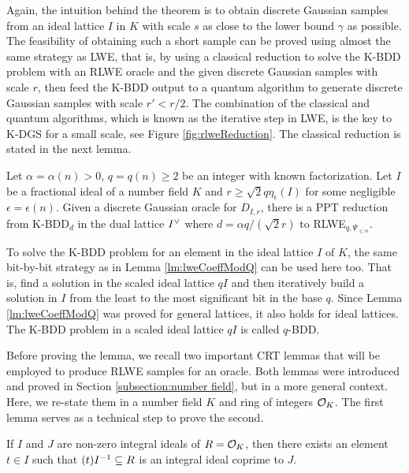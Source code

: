 \documentclass[../main.tex]{subfiles}
\begin{document}
Again, the intuition behind the theorem is to obtain discrete Gaussian samples from an ideal lattice $I$ in $K$ with scale $s$ as close to the lower bound $\gamma$ as possible. The feasibility of obtaining such a short sample can be proved using almost the same strategy as LWE, that is, by using a classical reduction to solve the K-BDD problem with an RLWE oracle and the given discrete Gaussian samples with scale $r$, then feed the K-BDD output to a quantum algorithm to generate discrete Gaussian samples with scale $r' < r/2$. The combination of the classical and quantum algorithms, which is known as the iterative step in LWE, is the key to K-DGS for a small scale, see Figure \ref{fig:rlweReduction}. The classical reduction is stated in the next lemma. 

\begin{lemma}
\reversemarginpar
{}
Let $\alpha =\alpha(n)> 0$, $q =q(n) \ge 2$ be an integer with known factorization. Let $I$ be a fractional ideal of a number field $K$ and $r\ge \sqrt{2} q \eta_{\epsilon}(I)$ for some negligible $\epsilon=\epsilon(n)$. Given a discrete Gaussian oracle for $D_{I,r}$, there is a PPT reduction from K-BDD$_d$ in the dual lattice $I^{\vee}$ where $d=\alpha q / (\sqrt{2}r)$ to RLWE$_{q,\Psi_{\le \alpha}}$.
\end{lemma}

To solve the K-BDD problem for an element in the ideal lattice $I$ of $K$, the same bit-by-bit strategy as in Lemma \ref{lm:lweCoeffModQ} can be used here too. That is, find a solution in the scaled ideal lattice $qI$ and then iteratively build a solution in $I$ from the least to the most significant bit in the base $q$. Since Lemma \ref{lm:lweCoeffModQ} was proved for general lattices, it also holds for ideal lattices. The K-BDD problem in a scaled ideal lattice $qI$ is called $q$-BDD. 

Before proving the lemma, we recall two important CRT lemmas that will be employed to produce RLWE samples for an oracle. Both lemmas were introduced and proved in Section \ref{subsection:number field}, but in a more general context. Here, we re-state them in a number field $K$ and ring of integers $\mathcal{O}_K$. The first lemma serves as a technical step to prove the second. 

\begin{lemma}
\label{lm:coprimeIdeals2}
If $I$ and $J$ are non-zero integral ideals of $R=\mathcal{O}_K$, then there exists an element $t \in I$ such that $(t)I^{-1} \subseteq R$ is an integral ideal coprime to $J$. 
\end{lemma}
\end{document}
